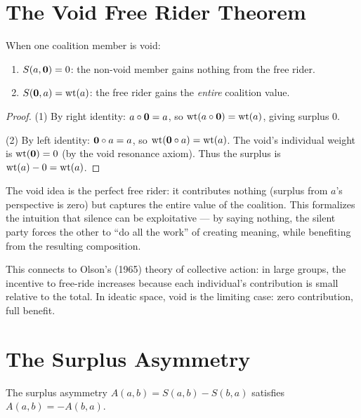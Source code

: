 \section{The Void Free Rider Theorem}

\begin{theorem}
\label{thm:void-free-rider}
When one coalition member is void:
\begin{enumerate}
\item $S(a, \mathbf{0}) = 0$: the non-void member gains nothing from the free rider.
\item $S(\mathbf{0}, a) = \operatorname{wt}(a)$: the free rider gains the \emph{entire} coalition value.
\end{enumerate}
\end{theorem}

\begin{proof}
(1) By right identity: $a \circ \mathbf{0} = a$, so $\operatorname{wt}(a \circ \mathbf{0}) = \operatorname{wt}(a)$, giving surplus $0$.

(2) By left identity: $\mathbf{0} \circ a = a$, so $\operatorname{wt}(\mathbf{0} \circ a) = \operatorname{wt}(a)$. The void's individual weight is $\operatorname{wt}(\mathbf{0}) = 0$ (by the void resonance axiom). Thus the surplus is $\operatorname{wt}(a) - 0 = \operatorname{wt}(a)$.
\end{proof}

\begin{interpretation}
The void idea is the perfect free rider: it contributes nothing (surplus from $a$'s perspective is zero) but captures the entire value of the coalition. This formalizes the intuition that silence can be exploitative --- by saying nothing, the silent party forces the other to ``do all the work'' of creating meaning, while benefiting from the resulting composition.

This connects to Olson's (1965) theory of collective action: in large groups, the incentive to free-ride increases because each individual's contribution is small relative to the total. In ideatic space, void is the limiting case: zero contribution, full benefit.
\end{interpretation}

\section{The Surplus Asymmetry}

\begin{theorem}
\label{thm:surplus-asymmetry}
The surplus asymmetry $A(a,b) = S(a,b) - S(b,a)$ satisfies $A(a,b) = -A(b,a)$.
\end{theorem}

